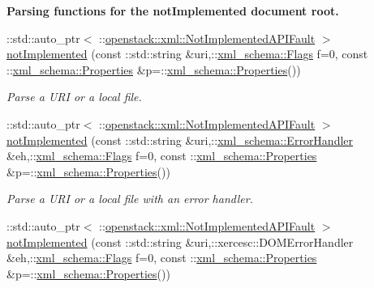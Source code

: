 \begin{Indent}{\bf Parsing functions for the notImplemented document root.}\par
\begin{DoxyCompactItemize}
\item 
::std::auto\_\-ptr$<$ ::\hyperlink{classopenstack_1_1xml_1_1NotImplementedAPIFault}{openstack::xml::NotImplementedAPIFault} $>$ \hyperlink{namespaceopenstack_1_1xml_a2e70628237d6af270f55d133cc4dc6e8}{notImplemented} (const ::std::string \&uri,::\hyperlink{namespacexml__schema_affb4c227cbd9aa7453dd1dc5a1401943}{xml\_\-schema::Flags} f=0, const ::\hyperlink{namespacexml__schema_ad27ce19a7ee1d3b1064092648898f64c}{xml\_\-schema::Properties} \&p=::\hyperlink{namespacexml__schema_ad27ce19a7ee1d3b1064092648898f64c}{xml\_\-schema::Properties}())
\begin{DoxyCompactList}\small\item\em Parse a URI or a local file. \item\end{DoxyCompactList}\item 
::std::auto\_\-ptr$<$ ::\hyperlink{classopenstack_1_1xml_1_1NotImplementedAPIFault}{openstack::xml::NotImplementedAPIFault} $>$ \hyperlink{namespaceopenstack_1_1xml_a15cf422f90b47fbecf7f38609c058082}{notImplemented} (const ::std::string \&uri,::\hyperlink{namespacexml__schema_ab1c9361bfd3b404eaabf0c31eded79dc}{xml\_\-schema::ErrorHandler} \&eh,::\hyperlink{namespacexml__schema_affb4c227cbd9aa7453dd1dc5a1401943}{xml\_\-schema::Flags} f=0, const ::\hyperlink{namespacexml__schema_ad27ce19a7ee1d3b1064092648898f64c}{xml\_\-schema::Properties} \&p=::\hyperlink{namespacexml__schema_ad27ce19a7ee1d3b1064092648898f64c}{xml\_\-schema::Properties}())
\begin{DoxyCompactList}\small\item\em Parse a URI or a local file with an error handler. \item\end{DoxyCompactList}\item 
::std::auto\_\-ptr$<$ ::\hyperlink{classopenstack_1_1xml_1_1NotImplementedAPIFault}{openstack::xml::NotImplementedAPIFault} $>$ \hyperlink{namespaceopenstack_1_1xml_a41abab8ca275a14c27e9ecceda9f0946}{notImplemented} (const ::std::string \&uri,::xercesc::DOMErrorHandler \&eh,::\hyperlink{namespacexml__schema_affb4c227cbd9aa7453dd1dc5a1401943}{xml\_\-schema::Flags} f=0, const ::\hyperlink{namespacexml__schema_ad27ce19a7ee1d3b1064092648898f64c}{xml\_\-schema::Properties} \&p=::\hyperlink{namespacexml__schema_ad27ce19a7ee1d3b1064092648898f64c}{xml\_\-schema::Properties}())

\end{DoxyCompactItemize}
\end{Indent}
